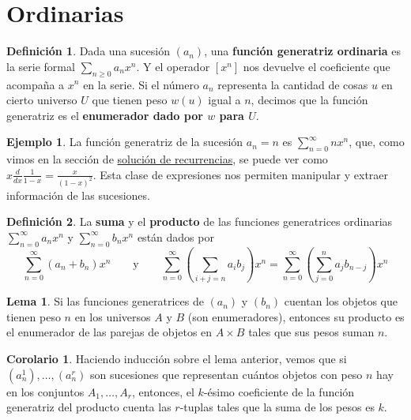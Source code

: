 \documentclass[spanish]{book}
\theoremstyle{definition}
\newtheorem*{defn}{Definición}
\newtheorem*{lema}{Lema}
\newtheorem*{coro}{Corolario}
\newtheorem*{ejem}{Ejemplo}
\begin{document}
\section{Ordinarias}
\begin{defn}
	Dada una sucesión $(a_n)$, una \textbf{función generatriz ordinaria} es la serie formal $\sum_{n\geq0}a_nx^n$. Y el operador $[x^n]$ nos devuelve el coeficiente que acompaña a $x^n$ en la serie. Si el número $a_n$ representa la cantidad de cosas $u$ en cierto universo $U$ que tienen peso $w(u)$ igual a $n$, decimos que la función generatriz es el \textbf{enumerador dado por $w$ para $U$}.
\end{defn}
\begin{ejem}
	La función generatriz de la sucesión $a_n=n$ es $\sum_{n=0}^\infty nx^n$, que, como vimos en la sección de \hyperref[sec:res-rec-fg]{solución de recurrencias}, se puede ver como $x\frac{d}{dx}\frac{1}{1-x}=\frac{x}{(1-x)^2}$. Esta clase de expresiones nos permiten manipular y extraer información de las sucesiones.
\end{ejem}
\begin{defn}
	La \textbf{suma} y el \textbf{producto} de las funciones generatrices ordinarias $\sum_{n=0}^\infty a_nx^n$ y $\sum_{n=0}^\infty b_nx^n$ están dados por 
	\[\sum_{n=0}^\infty (a_n+b_n)x^n\qquad\text{y}\qquad\sum_{n=0}^\infty \left(\sum_{i+j=n}a_ib_j\right)x^n=\sum_{n=0}^\infty \left(\sum_{j=0}^na_jb_{n-j}\right)x^n\]
\end{defn}
\begin{lema}
	Si las funciones generatrices de $(a_n)$ y $(b_n)$ cuentan los objetos que tienen peso $n$ en los universos $A$ y $B$ (son enumeradores),
	entonces su producto es el enumerador de las parejas de objetos en $A\times B$ tales que sus pesos suman $n$.
\end{lema}
\begin{coro}
	Haciendo inducción sobre el lema anterior, vemos que si $(a^1_n),\ldots,(a^r_n)$ son sucesiones que representan cuántos objetos con peso $n$ hay en los conjuntos $A_1,\ldots,A_r$, entonces, el $k$-ésimo coeficiente de la función generatriz del producto cuenta las $r$-tuplas tales que la suma de los pesos es $k$.
\end{coro}
\end{document}
